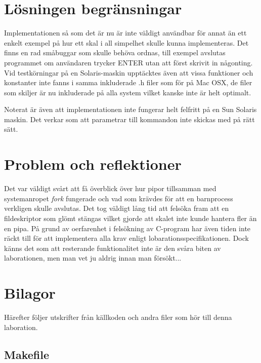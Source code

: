 \documentclass[a4paper, 12pt]{article}
\begin{document}
\section{Lösningen begränsningar}\label{sec:losningensbegransningar}
Implementationen så som det är nu är inte väldigt användbar för annat
än ett enkelt exempel på hur ett skal i all simpelhet skulle kunna
implementeras. Det finns en rad småbuggar som skulle behöva ordnas,
till exempel avslutas programmet om användaren trycker ENTER utan att
först skrivit in någonting. Vid testkörningar på en Solaris-maskin
upptäcktes även att vissa funktioner och konstanter inte fanns i samma
inkluderade .h filer som för på Mac OSX, de filer som skiljer är
nu inkluderade på alla system vilket kanske inte är helt optimalt.

Noterat är även att implementationen inte fungerar helt felfritt på en
Sun Solaris maskin. Det verkar som att parametrar till kommandon inte
skickas med på rätt sätt.

\section{Problem och reflektioner}\label{sec:problemochreflektioner}
Det var väldigt svårt att få överblick över hur pipor tillsamman med
systemanropet \textit{fork} fungerade och vad som krävdes för att en
barnprocess verkligen skulle avslutas. Det tog väldigt lång tid att
felsöka fram att en fildeskriptor som glömt stängas vilket gjorde att
skalet inte kunde hantera fler än en pipa. På grund av oerfarenhet i
felsökning av C-program har även tiden inte räckt till för att
implementera alla krav enligt lobarationsspecifikationen. Dock känns
det som att resterande funktionalitet inte är den svåra biten av
laborationen, men man vet ju aldrig innan man försökt...

\newpage
\appendix
{}
\section{Bilagor}\label{Bilagor}
Härefter följer utskrifter från källkoden och andra filer som hör till
denna laboration.

\newpage
\subsection{Makefile}\label{Makefile}
\begin{scriptsize}
  
\end{scriptsize}
\end{document}
